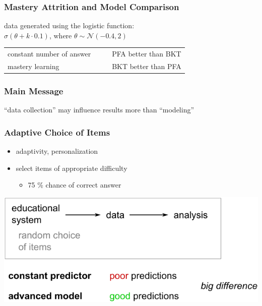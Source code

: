 \documentclass[bigger]{beamer}
\begin{document}
\begin{frame}
  \frametitle{Mastery Attrition and Model Comparison}
  
  data generated using the logistic function:\\
  $\sigma(\theta + k\cdot 0.1)$, where $\theta \sim \mathcal{N}(-0.4,2)$

  \bigskip
  \bigskip

  \begin{tabular}{lcl}
     constant number of answer & ~~ & PFA better than BKT \\
     mastery learning & ~~ & BKT better than PFA
  \end{tabular}
\end{frame}

\begin{frame}
  \frametitle{Main Message}

  \begin{block}{}
    ``data collection'' may influence results more than ``modeling''    
  \end{block}
\end{frame}

\begin{frame}
  \frametitle{Adaptive Choice of Items}
  
  \begin{itemize}
  \item adaptivity, personalization
  \item select items of appropriate difficulty 
    \begin{itemize}
    \item 75 \% chance of correct answer
    \end{itemize}
  \end{itemize}
\end{frame}





\begin{frame}
   \begin{center}
    \includegraphics[width=\linewidth]{intro-models1}
   \end{center}
\end{frame}
\end{document}
